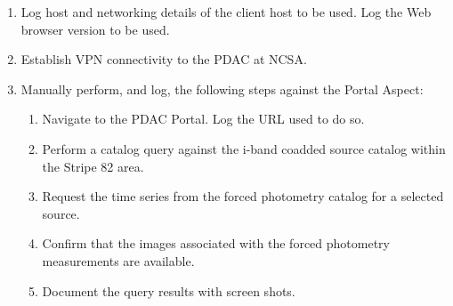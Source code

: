 \begin{enumerate}

  \item{Log host and networking details of the client host to be used.
 Log the Web browser version to be used.}
  \item{Establish VPN connectivity to the PDAC at NCSA.}
  \item{Manually perform, and log, the following steps against the Portal Aspect:
    \begin{enumerate}
      \item{Navigate to the PDAC Portal.  Log the URL used to do so.}
      \item{Perform a catalog query against the i-band coadded source catalog within the Stripe 82 area.}
      \item{Request the time series from the forced photometry catalog for a selected source.}
      \item{Confirm that the images associated with the forced photometry measurements are available.}
      \item{Document the query results with screen shots.}
    \end{enumerate}
  }

\end{enumerate}
